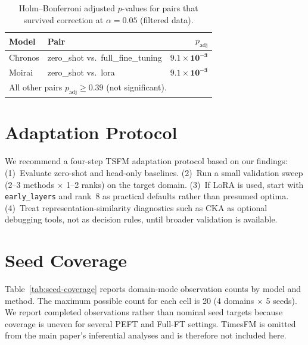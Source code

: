 \begin{table}[ht]
\centering
\caption{Holm--Bonferroni adjusted $p$-values for pairs that survived correction at $\alpha = 0.05$ (filtered data).}
\label{tab:holm}
\small
\begin{tabular}{llr}
\toprule
Model & Pair & $p_{\text{adj}}$ \\
\midrule
Chronos & zero\_shot vs.\ full\_fine\_tuning & $\mathbf{9.1{\times}10^{-3}}$ \\
Moirai  & zero\_shot vs.\ lora               & $\mathbf{9.1{\times}10^{-3}}$ \\
\bottomrule
\multicolumn{3}{l}{\scriptsize All other pairs $p_{\text{adj}} \geq 0.39$ (not significant).} \\
\end{tabular}
\end{table}

\section{Adaptation Protocol}
\label{sec:app-protocol}
We recommend a four-step TSFM adaptation protocol based on our findings: (1)~Evaluate zero-shot and head-only baselines. (2)~Run a small validation sweep (2--3 methods $\times$ 1--2 ranks) on the target domain. (3)~If LoRA is used, start with \texttt{early\_layers} and rank~8 as practical defaults rather than presumed optima. (4)~Treat representation-similarity diagnostics such as CKA as optional debugging tools, not as decision rules, until broader validation is available.

\section{Seed Coverage}
\label{sec:seed-cov}
Table~\ref{tab:seed-coverage} reports domain-mode observation counts by model and method. The maximum possible count for each cell is 20 (4 domains $\times$ 5 seeds). We report completed observations rather than nominal seed targets because coverage is uneven for several PEFT and Full-FT settings. TimesFM is omitted from the main paper's inferential analyses and is therefore not included here.

